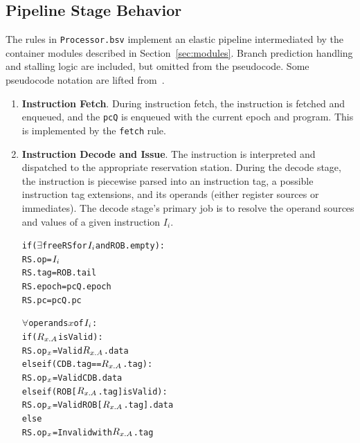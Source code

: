 \documentclass[12pt]{article}
\newcommand{\mtt}[1]{\(#1\)}
\begin{document}
\subsection{Pipeline Stage Behavior\label{sec:stages}}
The rules in \verb=Processor.bsv= implement an elastic pipeline intermediated
by the container modules described in Section~\ref{sec:modules}. Branch
prediction handling and stalling logic are included, but omitted from the
pseudocode. Some pseudocode notation are lifted from~\cite{99KMP}.
\begin{enumerate}
    \item \textbf{Instruction Fetch}. During instruction fetch, the instruction is fetched and enqueued, and the
\verb=pcQ= is enqueued with the current epoch and program. This is implemented
by the \verb=fetch= rule. 
        
    \item \textbf{Instruction Decode and Issue}. The instruction is interpreted and dispatched to the appropriate reservation
station. During the decode stage, the instruction is piecewise parsed into an
instruction tag, a possible instruction tag extensions, and its operands
(either register sources or immediates). The decode stage's primary job is to
resolve the operand sources and values of a given instruction $I_i$.
       \begin{alltt}
           if (\mtt{\exists} free RS for \mtt{I\sb{i}} and ROB.empty):
               RS.op =  \mtt{I\sb{i}}
               RS.tag = ROB.tail
               RS.epoch = pcQ.epoch
               RS.pc = pcQ.pc
               
               \mtt{\forall} operands \mtt{x} of \mtt{I\sb{i}}:
                   if (\mtt{R\sb{x.A}} is Valid):
                       RS.op\mtt{\sb{x}} = Valid \mtt{R\sb{x.A}}.data
                   else if (CDB.tag == \mtt{R\sb{x.A}}.tag):
                       RS.op\mtt{\sb{x}} = Valid CDB.data
                   else if (ROB[\mtt{R\sb{x.A}}.tag] is Valid):
                       RS.op\mtt{\sb{x}} = Valid ROB[\mtt{R\sb{x.A}}.tag].data
                   else
                       RS.op\mtt{\sb{x}} = Invalid with \mtt{R\sb{x.A}}.tag
                       

\end{alltt}
\end{enumerate}
\end{document}
